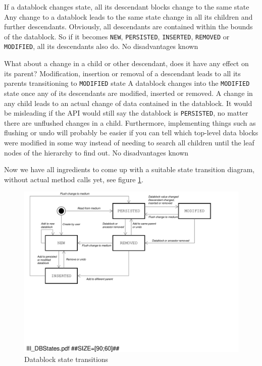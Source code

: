 {%
If a datablock changes state, all its descendant blocks change to the same state
}
{%
Any change to a datablock leads to the same state change in all its children and further descendants.
}
{%
Obviously, all descendants are contained within the bounds of the datablock. So if it becomes \texttt{NEW}, \texttt{PERSISTED}, \texttt{INSERTED}, \texttt{REMOVED} or \texttt{MODIFIED}, all its descendants also do.
}
{%
No disadvantages known
}

What about a change in a child or other descendant, does it have any effect on its parent?
{%
Modification, insertion or removal of a descendant leads to all its parents transitioning to \texttt{MODIFIED} state  
}
{%
A datablock changes into the \texttt{MODIFIED} state once any of its descendants are modified, inserted or removed.
}
{%
A change in any child leads to an actual change of data contained in the datablock. It would be misleading if the API would still say the datablock is \texttt{PERSISTED}, no matter there are unflushed changes in a child. Furthermore, implementing things such as flushing or undo will probably be easier if you can tell which top-level data blocks were modified in some way instead of needing to search all children until the leaf nodes of the hierarchy to find out.
}
{%
No disadvantages known
}

Now we have all ingredients to come up with a suitable state transition diagram, without actual method calls yet, see figure \ref{fig:III_DBStates.pdf}.

\begin{figure}[htbp]
  \centering
  \includegraphics[width=1.0\linewidth]{figures/III_DBStates.pdf}
  \caption{Datablock state transitions}
  \label{fig:III_DBStates.pdf}
\end{figure}

